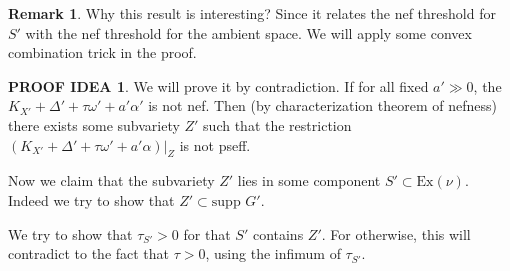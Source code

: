 \documentclass[11pt]{article}
\theoremstyle{definition}
\newtheorem{remark}[theorem]{Remark}
\newtheorem{proofidea}[theorem]{PROOF IDEA}
\begin{document}
	\begin{remark}
		Why this result is interesting? Since it relates the nef threshold for $S'$ with the nef threshold for the ambient space. We will apply some convex combination trick in the proof. 
	\end{remark}
	\begin{proofidea}
		We will prove it by contradiction. If for all fixed $a'\gg0 $, the $K_{X'}+ \Delta ' + \tau \omega ' + a' \alpha'$ is not nef. Then (by characterization theorem of nefness) there exists some subvariety $Z'$ such that the restriction $(K_{X'}+ \Delta ' + \tau \omega' + a' \alpha )|_{Z}$ is not pseff. 
		
		Now we claim that the subvariety $Z'$ lies in some component $S' \subset \text{Ex}(\nu)$. Indeed we try to show that $Z' \subset \text{supp }G'$. 
		
		We try to show that $\tau_{S'}>0$ for that $S'$ contains $Z'$. For otherwise, this will contradict to the fact that $\tau>0$, using the infimum of $\tau_{S'}$.
	\end{proofidea}
	
\end{document}
